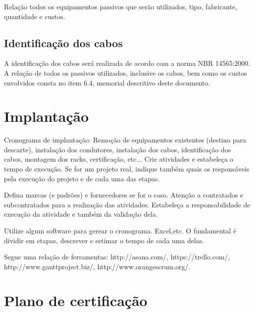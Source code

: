\documentclass[	DIV=calc,%
							paper=a4,%
							fontsize=12pt,%
							onecolumn]{scrartcl}	 					%
\begin{document}
Relação todos os equipamentos passivos que serão utilizados, tipo, fabricante, quantidade e custos.

\subsection{Identificação dos cabos}
A identificação dos cabos será realizada de acordo com a norma NBR 14565:2000. A relação de todos os passivos utilizados, inclusive os cabos, bem como os custos envolvidos consta no item 6.4, memorial descritivo deste documento. 

\section{Implantação}
Cronograma de implantação:
Remoção de equipamentos existentes (destino para descarte), instalação dos condutores, instalação dos cabos, 
identificação dos cabos, montagem dos racks, certificação, etc... Crie atividades e estabeleça o tempo de execução. Se for um projeto real, indique também quais os responsáveis pela execução do projeto e de cada uma das etapas.

Defina marcas (e padrões) e fornecedores se for o caso. Atenção a contratados e subcontratados para a realização das atividades. Estabeleça a responsabilidade de execução da atividade e também da validação dela.

Utilize algum software para gerear o cronograma. Excel,etc. O fundamental é dividir em etapas, descrever e estimar o tempo de cada uma delas.

Segue uma relação de ferramentas:
http://asana.com/, 
https://trello.com/, 
http://www.ganttproject.biz/, 
http://www.orangescrum.org/. 

\section{Plano de certificação}
\end{document}

